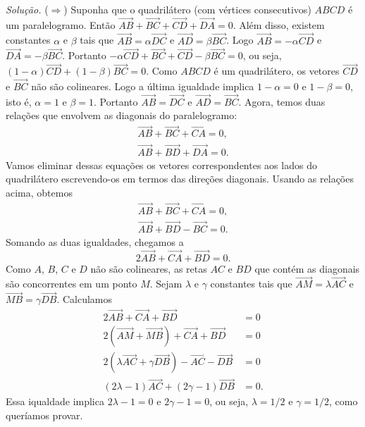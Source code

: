 \documentclass[a4paper,11pt]{article}
\begin{document}
\emph{Solução.}
($\Rightarrow$)
Suponha que o quadrilátero (com vértices consecutivos) $ABCD$ é um paralelogramo.
Então $\overrightarrow{AB} + \overrightarrow{BC} + \overrightarrow{CD} + \overrightarrow{DA} = 0$.
Além disso, existem constantes $\alpha$ e $\beta$ tais que $\overrightarrow{AB} = \alpha \overrightarrow{DC}$ e $\overrightarrow{AD} = \beta \overrightarrow{BC}$.
Logo $\overrightarrow{AB} = -\alpha \overrightarrow{CD}$ e $\overrightarrow{DA} = -\beta \overrightarrow{BC}$.
Portanto $-\alpha \overrightarrow{CD} + \overrightarrow{BC} + \overrightarrow{CD} -\beta \overrightarrow{BC} = 0$, ou seja, $(1-\alpha) \overrightarrow{CD} + (1-\beta) \overrightarrow{BC} = 0$.
Como $ABCD$ é um quadrilátero, os vetores $\overrightarrow{CD}$ e $\overrightarrow{BC}$ não são colineares.
Logo a última igualdade implica $1 - \alpha = 0$ e $1 - \beta = 0$, isto é, $\alpha = 1$ e $\beta = 1$.
Portanto $\overrightarrow{AB} = \overrightarrow{DC}$ e $\overrightarrow{AD} = \overrightarrow{BC}$.
Agora, temos duas relações que envolvem as diagonais do paralelogramo:
\begin{align*}
  \overrightarrow{AB} + \overrightarrow{BC} + \overrightarrow{CA} = 0, \\
  \overrightarrow{AB} + \overrightarrow{BD} + \overrightarrow{DA} = 0.
\end{align*}
Vamos eliminar dessas equações os vetores correspondentes aos lados do quadrilátero escrevendo-os em termos das direções diagonais.
Usando as relações acima, obtemos
\begin{align*}
  \overrightarrow{AB} + \overrightarrow{BC} + \overrightarrow{CA} = 0, \\
  \overrightarrow{AB} + \overrightarrow{BD} - \overrightarrow{BC} = 0.
\end{align*}
Somando as duas igualdades, chegamos a
\[
  2\overrightarrow{AB} + \overrightarrow{CA} + \overrightarrow{BD} = 0.
\]
Como $A$, $B$, $C$ e $D$ não são colineares, as retas $AC$ e $BD$ que contém as diagonais são concorrentes em um ponto $M$.
Sejam $\lambda$ e $\gamma$ constantes tais que $\overrightarrow{AM} = \lambda \overrightarrow{AC}$ e $\overrightarrow{MB} = \gamma \overrightarrow{DB}$.
Calculamos
\begin{align*}
  2\overrightarrow{AB} + \overrightarrow{CA} + \overrightarrow{BD} & = 0 \\
  2(\overrightarrow{AM} + \overrightarrow{MB}) + \overrightarrow{CA} + \overrightarrow{BD} & = 0 \\
  2(\lambda \overrightarrow{AC} + \gamma \overrightarrow{DB}) - \overrightarrow{AC} - \overrightarrow{DB} & = 0 \\
  (2\lambda - 1) \overrightarrow{AC} + (2\gamma - 1) \overrightarrow{DB} & = 0.
\end{align*}
Essa iqualdade implica $2\lambda - 1 = 0$ e $2\gamma - 1 = 0$, ou seja, $\lambda = 1/2$ e $\gamma = 1/2$, como queríamos provar.
\end{document}
